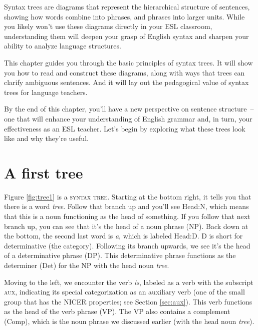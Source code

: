 Syntax trees are diagrams that represent the hierarchical structure of sentences, showing how words combine into phrases, and phrases into larger units. While you likely won't use these diagrams directly in your ESL classroom, understanding them will deepen your grasp of English syntax and sharpen your ability to analyze language structures.


This chapter guides you through the basic principles of syntax trees. It will show you how to read and construct these diagrams, along with ways that trees can clarify ambiguous sentences. And it will lay out the pedagogical value of syntax trees for language teachers.

By the end of this chapter, you'll have a new perspective on sentence structure~-- one that will enhance your understanding of English grammar and, in turn, your effectiveness as an ESL teacher. Let's begin by exploring what these trees look like and why they're useful.





\section{A first tree}

Figure \ref{fig:tree1} is a \textsc{syntax tree}. Starting at the bottom right, it tells you that there is a word \textit{tree}. Follow that branch up and you'll see Head:N, which means that this is a noun functioning as the head of something. If you follow that next branch up, you can see that it's the head of a noun phrase (NP). Back down at the bottom, the second last word is \textit{a}, which is labeled Head:D. D is short for determinative (the category). Following its branch upwards, we see it's the head of a determinative phrase (DP). This determinative phrase functions as the determiner (Det) for the NP with the head noun \textit{tree}.

Moving to the left, we encounter the verb \textit{is}, labeled as a verb with the subscript \textsc{aux}, indicating its special categorization as an auxiliary verb (one of the small group that has the NICER properties; see Section \ref{sec:aux}). This verb functions as the head of the verb phrase (VP). The VP also contains a complement (Comp), which is the noun phrase we discussed earlier (with the head noun \textit{tree}).


